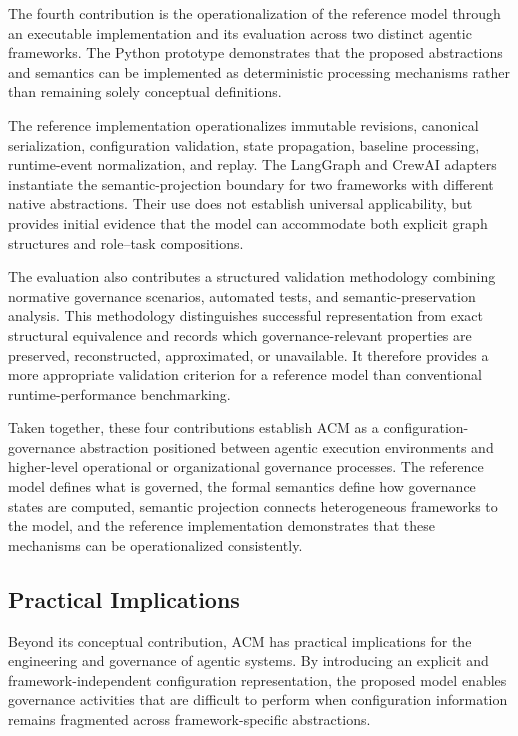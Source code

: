 \documentclass[10pt]{article}
\begin{document}
The fourth contribution is the operationalization of the reference model through an executable implementation and its evaluation across two distinct agentic frameworks. The Python prototype demonstrates that the proposed abstractions and semantics can be implemented as deterministic processing mechanisms rather than remaining solely conceptual definitions.

The reference implementation operationalizes immutable revisions, canonical serialization, configuration validation, state propagation, baseline processing, runtime-event normalization, and replay. The LangGraph and CrewAI adapters instantiate the semantic-projection boundary for two frameworks with different native abstractions. Their use does not establish universal applicability, but provides initial evidence that the model can accommodate both explicit graph structures and role--task compositions.

The evaluation also contributes a structured validation methodology combining normative governance scenarios, automated tests, and semantic-preservation analysis. This methodology distinguishes successful representation from exact structural equivalence and records which governance-relevant properties are preserved, reconstructed, approximated, or unavailable. It therefore provides a more appropriate validation criterion for a reference model than conventional runtime-performance benchmarking.

Taken together, these four contributions establish ACM as a configuration-governance abstraction positioned between agentic execution environments and higher-level operational or organizational governance processes. The reference model defines what is governed, the formal semantics define how governance states are computed, semantic projection connects heterogeneous frameworks to the model, and the reference implementation demonstrates that these mechanisms can be operationalized consistently.

\subsection{Practical Implications}
\label{sec:practical_implications}

Beyond its conceptual contribution, ACM has practical implications for the engineering and governance of agentic systems. By introducing an explicit and framework-independent configuration representation, the proposed model enables governance activities that are difficult to perform when configuration information remains fragmented across framework-specific abstractions.
\end{document}
